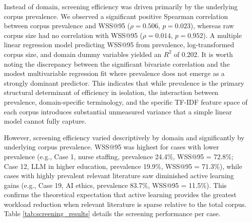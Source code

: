\documentclass[12pt]{article}
\begin{document}
Instead of domain, screening efficiency was driven primarily by the underlying corpus prevalence. We observed a significant positive Spearman correlation between corpus prevalence and WSS@95 ($\rho = 0.506$, $p = 0.023$), whereas raw corpus size had no correlation with WSS@95 ($\rho = 0.014$, $p = 0.952$). A multiple linear regression model predicting WSS@95 from prevalence, log-transformed corpus size, and domain dummy variables yielded an $R^2$ of 0.202. It is worth noting the discrepancy between the significant bivariate correlation and the modest multivariable regression fit where prevalence does not emerge as a strongly dominant predictor. This indicates that while prevalence is the primary structural determinant of efficiency in isolation, the interaction between prevalence, domain-specific terminology, and the specific TF-IDF feature space of each corpus introduces substantial unmeasured variance that a simple linear model cannot fully capture.

However, screening efficiency varied descriptively by domain and significantly by underlying corpus prevalence. WSS@95 was highest for cases with lower prevalence (e.g., Case 1, nurse staffing, prevalence 24.4\%, WSS@95 = 72.8\%; Case 12, LLM in higher education, prevalence 19.9\%, WSS@95 = 71.3\%), while cases with highly prevalent relevant literature saw diminished active learning gains (e.g., Case 19, AI ethics, prevalence 83.7\%, WSS@95 = 11.5\%). This confirms the theoretical expectation that active learning provides the greatest workload reduction when relevant literature is sparse relative to the total corpus. Table \ref{tab:screening_results} details the screening performance per case.
\end{document}
